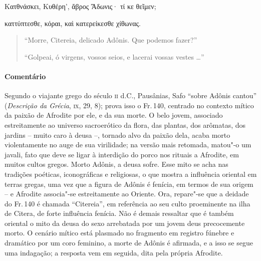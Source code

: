 \begin{gkverse}
Κατθνάσκει, Κυθέρη’, ἄβρος Ἄδωνις· τί κε θεῖμεν;

καττύπτεσθε, κόραι, καὶ κατερείκεσθε χίθωνας.
\end{gkverse}

\begin{verse}
“Morre, Citereia, delicado Adônis. Que podemos fazer?”

“Golpeai, ó virgens, vossos seios, e lacerai vossas vestes \ldots{}”
\end{verse}

{\paragraph{Comentário} Segundo o viajante grego do século \textsc{ii} d.C., Pausânias, Safo “sobre
Adônis cantou” (\textit{Descrição da Grécia}, \textsc{ix}, 29, 8); prova isso o Fr.\,140, 
centrado no contexto mítico da paixão de Afrodite por ele, e da sua morte.
O belo jovem, associado estreitamente ao universo sacroerótico da
flora, das plantas, dos arômatas, dos jardins -- muito caro à deusa --,
tornado alvo da paixão dela, acaba morto violentamente no auge de sua
virilidade; na versão mais retomada, matou"-o um javali, fato que deve se ligar
à interdição do porco nos rituais a Afrodite, em muitos cultos gregos. Morto
Adônis, a deusa sofre. Esse mito se acha nas tradições poéticas, iconográficas
e religiosas, o que mostra a influência oriental em terras gregas, uma vez que
a figura de Adônis é fenícia, em termos de sua origem -- e Afrodite associa"-se
estreitamente ao Oriente. Ora, repare"-se que a deidade do Fr.\,140 é chamada
``Citereia”, em referência ao seu culto proeminente na ilha de Citera,
de forte influência fenícia.
Não é demais ressaltar que é também oriental o
mito da deusa do sexo arrebatada por um jovem deus precocemente morto. O
cenário mítico está plasmado no fragmento em registro fúnebre e dramático por um coro feminino, a morte de Adônis é afirmada, e a isso
se segue uma indagação; a resposta vem em seguida, dita pela própria Afrodite.

}
